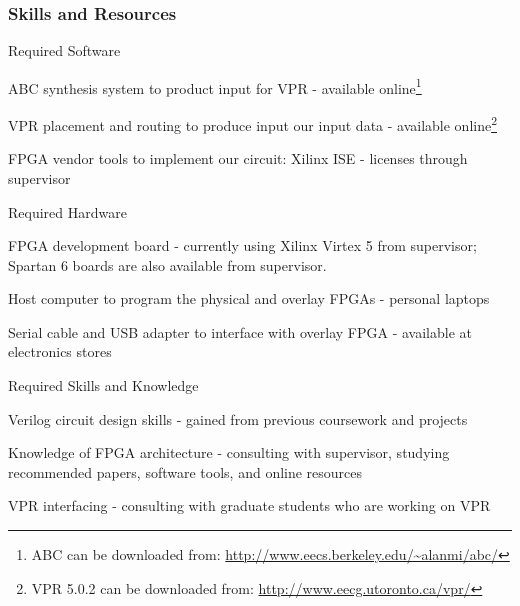 \begin{itemlist}

\subsubsection{Skills and Resources}

\begin{itemlist}
	\item Required Software \
		\begin{itemlist}
			\item ABC synthesis system to product input for VPR - available online\footnote{ABC can be downloaded from: \url{http://www.eecs.berkeley.edu/~alanmi/abc/}}
			\item VPR placement and routing to produce input our input data - available online\footnote{VPR 5.0.2 can be downloaded from: \url{http://www.eecg.utoronto.ca/vpr/}}
			\item FPGA vendor tools to implement our circuit: Xilinx ISE - licenses through supervisor
		\end{itemlist}
	\item Required Hardware \
		\begin{itemlist}
			\item FPGA development board - currently using Xilinx Virtex 5 from supervisor; Spartan 6 boards are also available from supervisor.
			\item Host computer to program the physical and overlay FPGAs - personal laptops
			\item Serial cable and USB adapter to interface with overlay FPGA - available at electronics stores
		\end{itemlist}
	\item Required Skills and Knowledge \
		\begin{itemlist}
			\item Verilog circuit design skills - gained from previous coursework and projects
			\item Knowledge of FPGA architecture - consulting with supervisor, studying recommended papers, software tools, and online resources
			\item VPR interfacing - consulting with graduate students who are working on VPR
		\end{itemlist}
\end{itemlist}



\end{itemlist}
